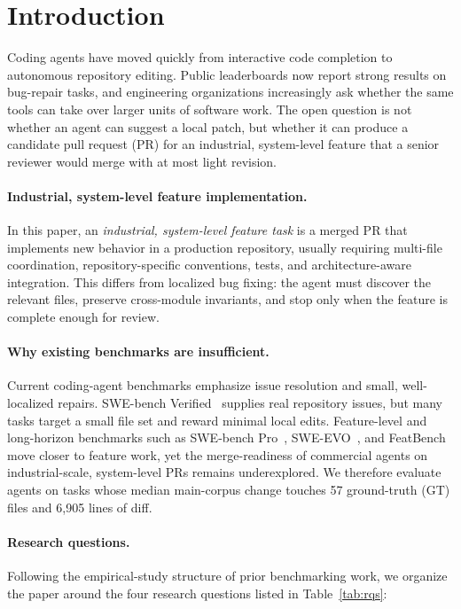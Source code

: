\section{Introduction}
\label{sec:introduction}

Coding agents have moved quickly from interactive code completion to autonomous repository editing. Public leaderboards now report strong results on bug-repair tasks, and engineering organizations increasingly ask whether the same tools can take over larger units of software work. The open question is not whether an agent can suggest a local patch, but whether it can produce a candidate pull request (PR) for an industrial, system-level feature that a senior reviewer would merge with at most light revision.

\paragraph{Industrial, system-level feature implementation.}
In this paper, an \emph{industrial, system-level feature task} is a merged PR that implements new behavior in a production repository, usually requiring multi-file coordination, repository-specific conventions, tests, and architecture-aware integration. This differs from localized bug fixing: the agent must discover the relevant files, preserve cross-module invariants, and stop only when the feature is complete enough for review.

\paragraph{Why existing benchmarks are insufficient.}
Current coding-agent benchmarks emphasize issue resolution and small, well-localized repairs. SWE-bench Verified~\cite{jimenez2024swebench,chowdhury2024swebenchverified} supplies real repository issues, but many tasks target a small file set and reward minimal local edits. Feature-level and long-horizon benchmarks such as SWE-bench Pro~\cite{swebenchpro2025}, SWE-EVO~\cite{sweevo}, and FeatBench~\cite{featbench2025} move closer to feature work, yet the merge-readiness of commercial agents on industrial-scale, system-level PRs remains underexplored. We therefore evaluate agents on tasks whose median main-corpus change touches 57 ground-truth (GT) files and 6{,}905 lines of diff.

\paragraph{Research questions.}
Following the empirical-study structure of prior benchmarking work, we organize the paper around the four research questions listed in Table~\ref{tab:rqs}:

